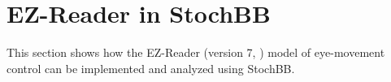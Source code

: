 \section{EZ-Reader in StochBB}
This section shows how the EZ-Reader (version 7, \cite{Reichle2003}) model of eye-movement control can be implemented and analyzed using StochBB.

